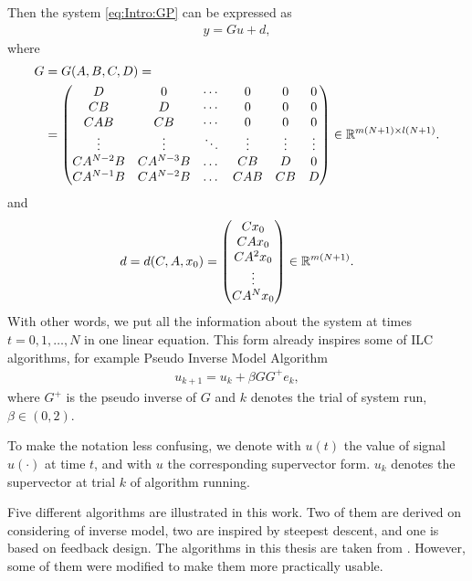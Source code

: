 Then the system \eqref{eq:Intro:GP} can be expressed as 
\begin{align*}
y = G u + d, 
\end{align*}
where 
\begin{align*}
\begin{split}
G &= G(A,B,C,D) = \\
&=  \begin{pmatrix}
D & 0 & \cdots & 0 & 0 & 0 \\
CB & D & \cdots & 0 & 0 & 0\\
CAB & CB & \cdots & 0 & 0 & 0\\
\vdots & \vdots & \ddots & \vdots  & \vdots & \vdots \\
CA^{N-2} B & CA^{N-3} B &\dots &CB & D& 0\\
CA^{N-1} B & CA^{N-2} B &\dots &CAB & CB& D\\
\end{pmatrix} \in {\mathbb{R}}^{m(N+1)\times l(N+1)}.
\end{split}
\end{align*}
and 
\begin{align*}
d = d(C,A,x_0) = \begin{pmatrix}
C x_0 \\ CA x_0 \\ CA^2 x_0 \\ \vdots \\ CA^Nx_0
\end{pmatrix} \in {\mathbb{R}}^{m(N+1)}.
\end{align*}
With other words, we put all the information about the system at times $t = 0, 1,  \dots, N$ in one linear equation. This form already inspires some of ILC algorithms, for example Pseudo Inverse Model Algorithm 
\begin{align*}
u_{k+1} = u_k + \beta G G^+ e_k, 
\end{align*}
where $G^+$ is the pseudo inverse of $G$ and $k$ denotes the trial of system run, $\beta \in (0,2)$.

To make the notation less confusing, we denote with $u(t)$ the value of signal $u(\cdot)$ at time $t$, and with $u$ the corresponding supervector form. $u_k$ denotes the supervector at trial $k$ of algorithm running.

Five different algorithms are illustrated in this work. Two of them are derived on considering of inverse model, two are inspired by steepest descent, and one is based on feedback design. The algorithms in this thesis are taken from \cite{ILC}. However, some of them were modified to make them more practically usable. 

